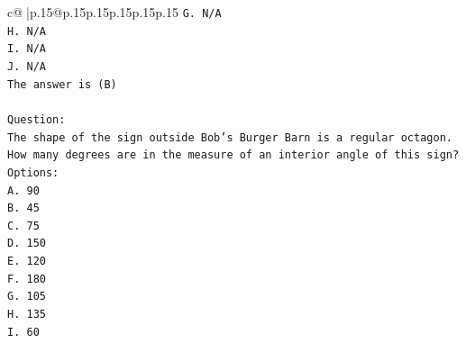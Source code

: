 \documentclass{article}
\begin{document}
{\begin{supertabular}{c@{$\;$}|p{.15\linewidth}@{}p{.15\linewidth}p{.15\linewidth}p{.15\linewidth}p{.15\linewidth}p{.15\linewidth}}
{{{\texttt{G. N/A} \\
\texttt{H. N/A} \\
\texttt{I. N/A} \\
\texttt{J. N/A} \\
\texttt{The answer is (B)} \\
\\ 
\texttt{Question:} \\
\texttt{The shape of the sign outside Bob's Burger Barn is a regular octagon. How many degrees are in the measure of an interior angle of this sign?} \\
\texttt{Options:} \\
\texttt{A. 90} \\
\texttt{B. 45} \\
\texttt{C. 75} \\
\texttt{D. 150} \\
\texttt{E. 120} \\
\texttt{F. 180} \\
\texttt{G. 105} \\
\texttt{H. 135} \\
\texttt{I. 60} \\
            }
        }
    }
     \\ \\


\end{supertabular}}
\end{document}

